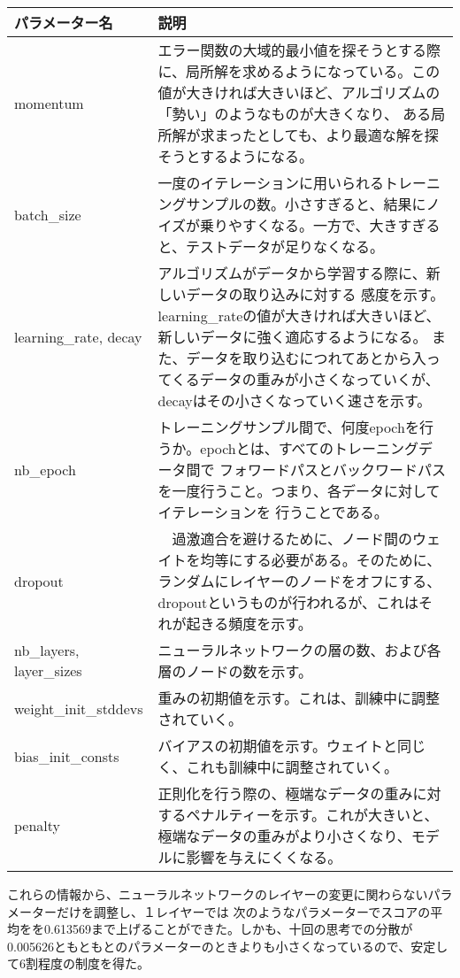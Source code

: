 \documentclass[a4j,11pt]{jarticle}
\begin{document}
\begin{table}[htb]
	\begin{tabular}{|l||p{10cm}|} \hline
		パラメーター名        & 説明　\\ \hline \hline
		momentum             & 
エラー関数の大域的最小値を探そうとする際に、局所解を求めるようになっている。この値が大きければ大きいほど、アルゴリズムの「勢い」のようなものが大きくなり、
ある局所解が求まったとしても、より最適な解を探そうとするようになる。\\ \hline
		batch\_size           & 
一度のイテレーションに用いられるトレーニングサンプルの数。小さすぎると、結果にノイズが乗りやすくなる。一方で、大きすぎると、テストデータが足りなくなる。 \\ \hline
		learning\_rate, decay &
アルゴリズムがデータから学習する際に、新しいデータの取り込みに対する
感度を示す。learning\_rateの値が大きければ大きいほど、新しいデータに強く適応するようになる。
また、データを取り込むにつれてあとから入ってくるデータの重みが小さくなっていくが、decayはその小さくなっていく速さを示す。\\ \hline
		nb\_epoch	     &
トレーニングサンプル間で、何度epochを行うか。epochとは、すべてのトレーニングデータ間で
フォワードパスとバックワードパスを一度行うこと。つまり、各データに対してイテレーションを
行うことである。\\ \hline
		dropout              &　過激適合を避けるために、ノード間のウェイトを均等にする必要がある。そのために、ランダムにレイヤーのノードをオフにする、
dropoutというものが行われるが、これはそれが起きる頻度を示す。\\ \hline
		nb\_layers, layer\_sizes &
ニューラルネットワークの層の数、および各層のノードの数を示す。\\ \hline
		weight\_init\_stddevs  &
重みの初期値を示す。これは、訓練中に調整されていく。\\ \hline
		bias\_init\_consts     &
バイアスの初期値を示す。ウェイトと同じく、これも訓練中に調整されていく。\\ \hline
		penalty              &
正則化を行う際の、極端なデータの重みに対するペナルティーを示す。これが大きいと、極端なデータの重みがより小さくなり、モデルに影響を与えにくくなる。\\ \hline
	\end{tabular}
\end{table}

これらの情報から、ニューラルネットワークのレイヤーの変更に関わらないパラメーターだけを調整し、１レイヤーでは
次のようなパラメーターでスコアの平均をを0.613569まで上げることができた。しかも、十回の思考での分散が0.005626ともともとのパラメーターのときよりも小さくなっているので、安定して6割程度の制度を得た。
\end{document}
